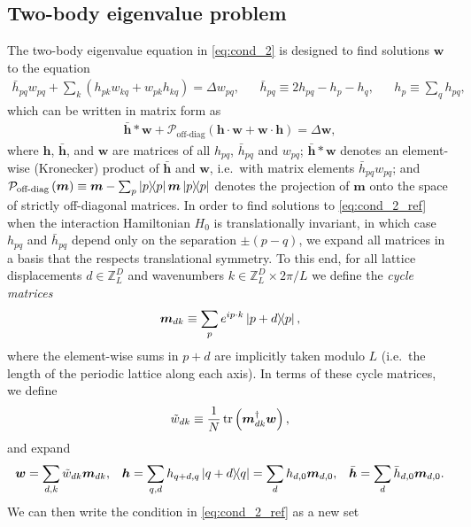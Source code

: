 \documentclass[nofootinbib,notitlepage,11pt]{revtex4-2}
\renewcommand{\t}{\text} %
\newcommand{\f}[2]{\dfrac{#1}{#2}} %
\newcommand{\p}[1]{\left(#1\right)} %
\renewcommand{\c}{\cdot} %
\newcommand{\m}{\bm} %
\newcommand{\1}{\mathds{1}}
\renewcommand{\P}{\mathcal{P}}
\newcommand{\ZZ}{\mathbb{Z}}
\begin{document}
\subsection{Two-body eigenvalue problem}
\label{sec:trans_inv_two}

The two-body eigenvalue equation in \eqref{eq:cond_2} is designed to
find solutions $\m w$ to the equation
\begin{align}
  \bar h_{pq} w_{pq}
  + \sum_k \p{h_{pk} w_{kq} + w_{pk} h_{kq}}
  = \Delta w_{pq},
  &&
  \bar h_{pq} \equiv 2h_{pq} - h_p - h_q,
  &&
  h_p \equiv \sum_q h_{pq},
  \label{eq:cond_2_ref_start}
\end{align}
which can be written in matrix form as
\begin{align}
  \bar{\m h} * \m w + \P_{\t{off-diag}}\p{\m h\c\m w + \m w\c\m h}
  = \Delta \m w,
  \label{eq:cond_2_ref}
\end{align}
where $\m h$, $\bar{\m h}$, and $\m w$ are matrices of all $h_{pq}$,
$\bar h_{pq}$ and $w_{pq}$; $\bar{\m h}*\m w$ denotes an element-wise
(Kronecker) product of $\bar{\m h}$ and $\m w$, i.e.~with matrix
elements $\bar h_{pq}w_{pq}$; and
$\P_{\t{off-diag}}\p{\m m}\equiv \m m-\sum_p\op{p}\m m\op{p}$ denotes
the projection of $\m m$ onto the space of strictly off-diagonal
matrices.  In order to find solutions to \eqref{eq:cond_2_ref} when
the interaction Hamiltonian $H_0$ is translationally invariant, in
which case $h_{pq}$ and $\bar h_{pq}$ depend only on the separation
$\pm\p{p-q}$, we expand all matrices in a basis that the respects
translational symmetry.  To this end, for all lattice displacements
$d\in\ZZ_L^D$ and wavenumbers $k\in\ZZ_L^D\times2\pi/L$ we define the
{\it cycle matrices}
\begin{align}
  \m m_{dk} \equiv \sum_p e^{ip\c k} \op{p+d}{p},
  \label{eq:cycle}
\end{align}
where the element-wise sums in $p+d$ are implicitly taken modulo $L$
(i.e.~the length of the periodic lattice along each axis).  In terms
of these cycle matrices, we define
\begin{align}
  \tilde w_{dk} \equiv \f1N \tr\p{\m m_{dk}^\dag \m w},
\end{align}
and expand
\begin{align}
  \m w = \sum_{d,k} \tilde w_{dk} \m m_{dk},
  &&
  \m h = \sum_{q,d} h_{q+d,q} \op{q+d}{q}
  = \sum_d h_{d,0} \m m_{d,0},
  &&
  \bar{\m h} = \sum_d \bar h_{d,0} \m m_{d,0}.
\end{align}
We can then write the condition in \eqref{eq:cond_2_ref} as a new set
\end{document}
